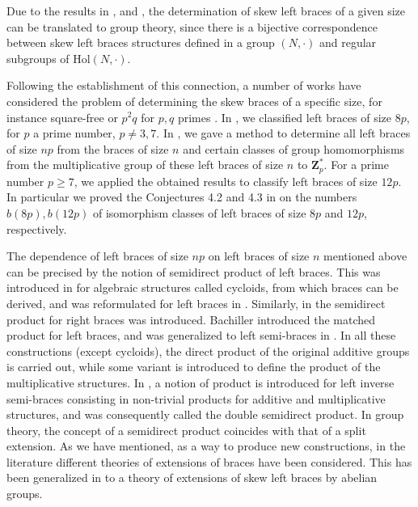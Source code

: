 \documentclass[12pt]{article}
\theoremstyle{definition}
\newcommand{\Z}{\mathbf Z}
\newcommand{\Hol}{\mathrm{Hol}}
\begin{document}
    
    Due to the results in \cite{CR09}, \cite{B16} and \cite{GV},
	the determination of skew left braces of a given size can be translated to group theory, since there is a bijective correspondence between skew left braces structures defined in a group  $(N,\cdot)$ and regular subgroups of $\Hol(N,\cdot)$.

    Following the establishment of this connection, a number of works have considered the problem of determining the skew braces of a specific size, for instance square-free \cite{AB21} or $p^2q$ for $p,q$ primes \cite{AB22a,AB22b,CCD20,CCD24}.
	In \cite{CGRV1}, we classified left braces of size $8p$, for $p$ a prime number, $p \neq 3,7$.
	In \cite{CGRV2}, we gave a method to determine all left braces of size $np$ from the braces of size $n$ and certain classes of group homomorphisms from the multiplicative group of these left braces of size $n$ to $\Z_p^*$. For a prime number $p\geq 7$, we applied the obtained results to classify left braces of size $12p$. In particular we proved the Conjectures 4.2 and 4.3 in \cite{BNY} on the numbers $b(8p), b(12p)$ of isomorphism classes of left braces of size $8p$ and $12p$, respectively.

    The dependence of left braces of size $np$ on left braces of size $n$ mentioned above can be precised by the notion of semidirect product of left braces. This was introduced in \cite{R08} for algebraic structures called cycloids, from which braces can be derived, and was reformulated for left braces in \cite{Cedo,CJO}. Similarly, in \cite{CCS16} the semidirect product for right braces was introduced. Bachiller \cite{B18} introduced the matched product for left braces, and was generalized to left semi-braces in \cite{CCS20}. In all these constructions (except cycloids), the direct product of the original additive groups is carried out, while some variant is introduced to define the product of the multiplicative structures. In \cite{CMS22}, a notion of product is introduced for left inverse semi-braces consisting in non-trivial products for additive and multiplicative structures, and was consequently called the double semidirect product. In group theory, the concept of a semidirect product coincides with that of a split extension. As we have mentioned, as a way to produce new constructions, in the literature different theories of extensions of braces have been considered. This has been generalized in \cite{RY24}
    to a theory of extensions of skew left braces by abelian groups. 
    
\end{document}
